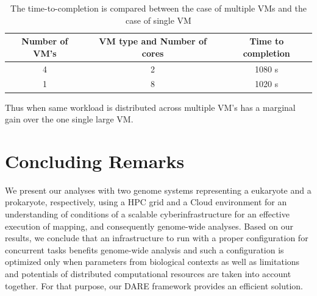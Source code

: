 \documentclass[12pt]{article}
\begin{document}
 \begin{table}
 \begin{tabular}{|c|c|c|} 
 \hline 
Number of VM's & VM type and Number of cores & Time to completion \\ \hline
4 &  2 & 1080 s \\
1 & 8 & 1020 s \\
 \hline 
 \end{tabular}
 \label{table:cloud VM's} 
 \caption{The time-to-completion is compared between the case of multiple VMs and the case of single VM}
\end{table}

Thus when same workload is distributed across multiple VM's has a marginal gain over the one single large VM.


\section{Concluding Remarks}
We present our analyses with two genome systems representing a eukaryote and a prokaryote, respectively, using
 a HPC grid and a Cloud environment for an understanding of conditions of a scalable cyberinfrastructure for an effective execution of
 mapping, and consequently genome-wide analyses.   Based on our results, we conclude that an infrastructure to run with a proper configuration for concurrent tasks benefits genome-wide analysis and such a configuration is optimized only when parameters from biological contexts as well as limitations and potentials of distributed computational resources are taken into account together.  For that purpose, our DARE framework provides an efficient solution.  




%

\end{document}
